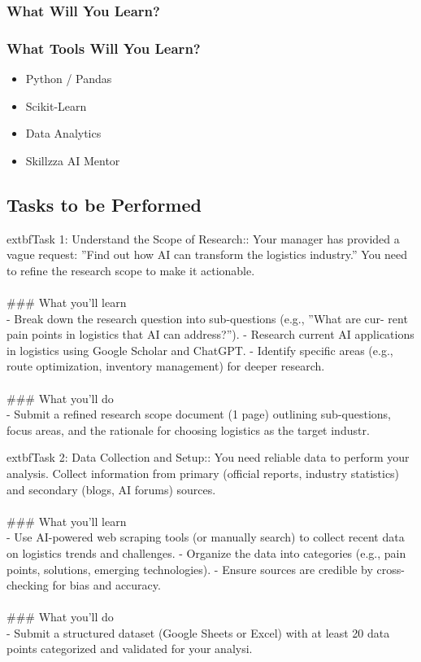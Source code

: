 \documentclass{article}
\begin{document}
\subsubsection*{What Will You Learn?}
\begin{itemize}
\end{itemize}

\subsubsection*{What Tools Will You Learn?}
\begin{itemize}
    \item Python / Pandas
    \item Scikit-Learn
    \item Data Analytics
    \item Skillzza AI Mentor
\end{itemize}

\subsection*{Tasks to be Performed}
	extbf{Task 1:} Understand the Scope of Research:: Your manager has provided a vague request: ”Find out how AI can transform the logistics industry.” You need to refine the research scope to make it actionable. \\
 \\
### What you'll learn \\
- Break down the research question into sub-questions (e.g., ”What are cur- rent pain points in logistics that AI can address?”). - Research current AI applications in logistics using Google Scholar and ChatGPT. - Identify specific areas (e.g., route optimization, inventory management) for deeper research. \\
 \\
### What you'll do \\
- Submit a refined research scope document (1 page) outlining sub-questions, focus areas, and the rationale for choosing logistics as the target industr.

	extbf{Task 2:} Data Collection and Setup:: You need reliable data to perform your analysis. Collect information from primary (official reports, industry statistics) and secondary (blogs, AI forums) sources. \\
 \\
### What you'll learn \\
- Use AI-powered web scraping tools (or manually search) to collect recent data on logistics trends and challenges. - Organize the data into categories (e.g., pain points, solutions, emerging technologies). - Ensure sources are credible by cross-checking for bias and accuracy. \\
 \\
### What you'll do \\
- Submit a structured dataset (Google Sheets or Excel) with at least 20 data points categorized and validated for your analysi.
\end{document}
